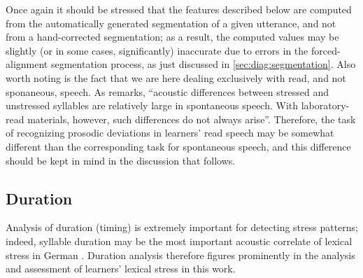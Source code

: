 Once again it should be stressed that the features described below are computed from the automatically generated segmentation of a given utterance, and not from a hand-corrected segmentation; as a result, the computed values may be slightly (or in some cases, significantly) inaccurate due to errors in the forced-alignment segmentation process, as just discussed in \cref{sec:diag:segmentation}. %
	Also worth noting is the fact that we are here dealing exclusively with read, and not sponaneous, speech. As \textcite[p.~275]{Cutler2005} remarks, ``acoustic differences between stressed and unstressed syllables are relatively large in spontaneous speech. With laboratory-read materials, however, such differences do not always arise''. Therefore, the task of recognizing prosodic deviations in learners' read speech may be somewhat different than the corresponding task for spontaneous speech, and this difference should be kept in mind in the discussion that follows.

	\subsection{Duration}
	\label{sec:prosody:duration}
	Analysis of duration (timing) is extremely important for detecting stress patterns;
indeed, syllable duration may be the most important acoustic correlate of lexical stress in German \citep{Dogil1999}.
Duration analysis therefore figures prominently in the analysis and assessment of learners' lexical stress in this work. 


